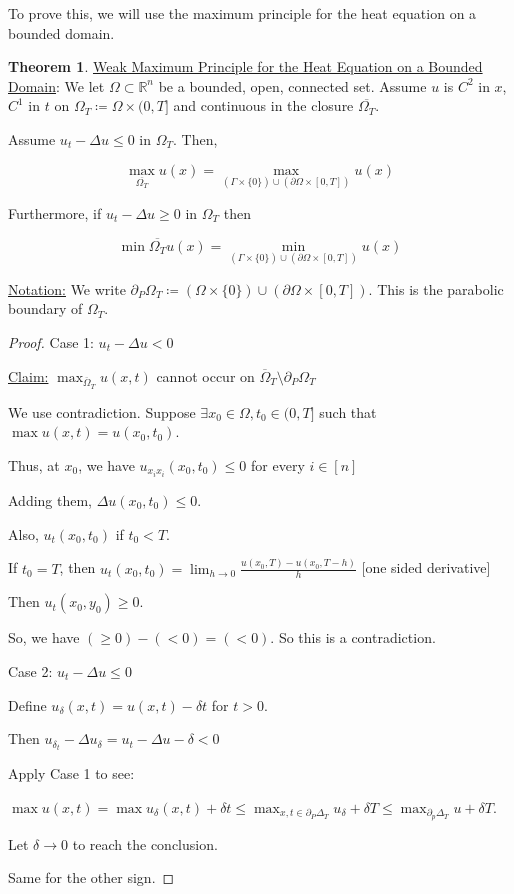 \documentclass{article}
\theoremstyle{definition}
\newtheorem{theorem}{Theorem}
\begin{document}
To prove this, we will use the maximum principle for the heat equation on a bounded domain.

\begin{theorem}

    \underline{Weak Maximum Principle for the Heat Equation on a Bounded Domain}: We let \(\Omega \subset \mathbb{R}^n\) be a bounded, open, connected set. Assume \(u\) is \(C^2\) in \(x\), \(C^1\) in \(t\) on \(\Omega_T \coloneqq \Omega\times (0,T]\) and continuous in the closure \(\overline{\Omega_T}\).

    Assume \(u_t - \Delta u \leq 0\) in \(\Omega_T\). Then,

    \[
        \max_{\overline{\Omega_T} } u(x) = \max_{(\Gamma\times \{ 0 \}) \cup (\partial \Omega \times [0,T]) } u(x)
    \]

    Furthermore, if \(u_t - \Delta u \geq 0\) in \(\Omega_T\) then

    \[
        \min{\overline{\Omega_T} } u(x) = \min_{(\Gamma\times \{ 0 \}) \cup (\partial \Omega \times [0,T]) } u(x)
    \]

    \underline{Notation:} We write \(\partial_P \Omega_T \coloneqq (\Omega \times \{ 0 \} )\cup  (\partial \Omega \times [0,T])\). This is the parabolic boundary of \(\Omega_T\).

\end{theorem}

\begin{proof}
    Case 1: \(u_t - \Delta u < 0\) 

    \underline{Claim:} \(\max_{\overline{\Omega }_T} u(x,t)\) cannot occur on \(\overline{\Omega}_T \setminus \partial _P \Omega_T\) 
    
    We use contradiction. Suppose \(\exists x_0\in \Omega, t_0\in (0,T]\) such that \(\max u(x,t) = u(x_0,t_0)\).

    Thus, at \(x_0\), we have \(u_{x_i x_i}(x_0,t_0) \leq 0\) for every \(i\in [n]\) 
    
    Adding them, \(\Delta u(x_0,t_0) \leq 0\).

    Also, \(u_t (x_0,t_0)\) if \(t_0 < T\).

    If \(t_0 = T\), then \(u_t(x_0,t_0)=\lim_{h\to 0} \frac{u(x_0,T) - u(x_0,T - h)}{h} \) [one sided derivative]
    
    Then \(u_t(x_0,y_0) \geq 0\).

    So, we have \((\geq 0) - (< 0) = (< 0)\). So this is a contradiction.

    Case 2: \(u_t - \Delta u \leq 0\)

    Define \(u_\delta (x,t) = u(x,t) - \delta t\) for \(t > 0\).

    Then \(u_{\delta _t} - \Delta u_\delta = u_t - \Delta u - \delta < 0\)

    Apply Case 1 to see:

    \(\max u(x,t) = \max u_\delta (x,t) + \delta t \leq \max_{x,t\in \partial_P \Delta_T} u_\delta + \delta T \leq \max_{\partial_p \Delta_T} u + \delta T\).
    
    Let \(\delta \to 0\) to reach the conclusion.

    Same for the other sign.

\end{proof}
\end{document}
